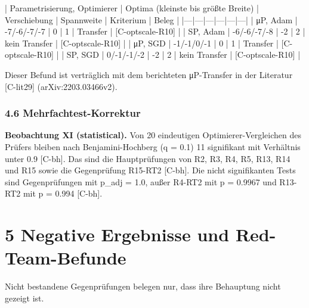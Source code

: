 \documentclass[10pt,twocolumn]{article}
\begin{document}
| Parametrisierung, Optimierer | Optima (kleinste bis größte Breite) | Verschiebung | Spannweite | Kriterium | Beleg |
|---|---|---|---|---|---|
| μP, Adam | -7/-6/-7/-7 | 0 | 1 | Transfer | {\scriptsize[C-optscale-R10]} |
| SP, Adam | -6/-6/-7/-8 | -2 | 2 | kein Transfer | {\scriptsize[C-optscale-R10]} |
| μP, SGD | -1/-1/0/-1 | 0 | 1 | Transfer | {\scriptsize[C-optscale-R10]} |
| SP, SGD | 0/-1/-1/-2 | -2 | 2 | kein Transfer | {\scriptsize[C-optscale-R10]} |

Dieser Befund ist verträglich mit dem berichteten μP-Transfer in der Literatur {\scriptsize[C-lit29]} (arXiv:2203.03466v2).

\subsubsection*{4.6 Mehrfachtest-Korrektur}

\textbf{Beobachtung XI (statistical).} Von 20 eindeutigen Optimierer-Vergleichen des Prüfers bleiben nach Benjamini-Hochberg (q = 0.1) 11 signifikant mit Verhältnis unter 0.9 {\scriptsize[C-bh]}. Das sind die Hauptprüfungen von R2, R3, R4, R5, R13, R14 und R15 sowie die Gegenprüfung R15-RT2 {\scriptsize[C-bh]}. Die nicht signifikanten Tests sind Gegenprüfungen mit p_adj = 1.0, außer R4-RT2 mit p = 0.9967 und R13-RT2 mit p = 0.994 {\scriptsize[C-bh]}.

\section{5 Negative Ergebnisse und Red-Team-Befunde}

Nicht bestandene Gegenprüfungen belegen nur, dass ihre Behauptung nicht gezeigt ist.
\end{document}
